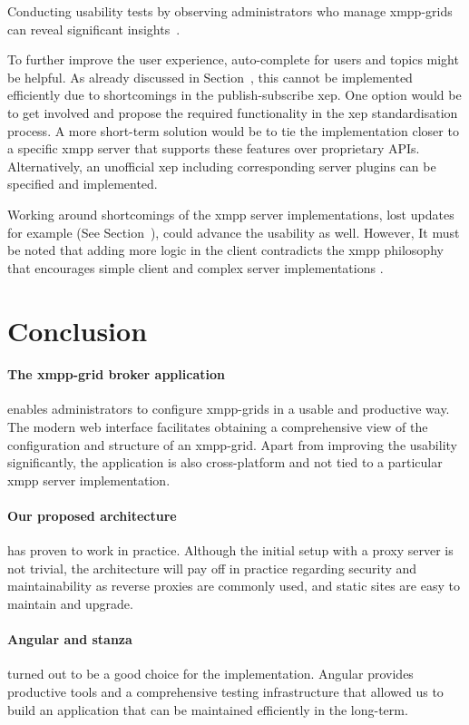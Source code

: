 Conducting usability tests by observing administrators who manage \glspl{xmpp-grid} can reveal significant insights~\cite{krug:dont-make-me-think}.

To further improve the user experience, auto-complete for users and topics might be helpful.
As already discussed in Section~, this cannot be implemented efficiently due to shortcomings in the \gls{publish-subscribe} \gls{xep}.
One option would be to get involved and propose the required functionality in the \gls{xep} standardisation process.
A more short-term solution would be to tie the implementation closer to a specific \gls{xmpp} server that supports these features over proprietary APIs.
Alternatively, an unofficial \gls{xep} including corresponding server plugins can be specified and implemented.

Working around shortcomings of the \gls{xmpp} server implementations, lost updates for example (See Section~), could advance the usability as well.
However, It must be noted that adding more logic in the client contradicts the \gls{xmpp} philosophy that encourages simple client and complex server implementations \cite{definitive-guide-xmpp}.

\section{Conclusion}
\paragraph{The \gls{xmpp-grid} \gls{broker} application} enables administrators to configure \glspl{xmpp-grid} in a usable and productive way.
The modern web interface facilitates obtaining a comprehensive view of the configuration and structure of an \gls{xmpp-grid}.
Apart from improving the usability significantly, the application is also cross-platform and not tied to a particular \gls{xmpp} server implementation.

\paragraph{Our proposed architecture} has proven to work in practice.
Although the initial setup with a proxy server is not trivial, the architecture will pay off in practice regarding security and maintainability as reverse proxies are commonly used, and static sites are easy to maintain and upgrade.

\paragraph{Angular and stanza} turned out to be a good choice for the implementation.
Angular provides productive tools and a comprehensive testing infrastructure that allowed us to build an application that can be maintained efficiently in the long-term.

